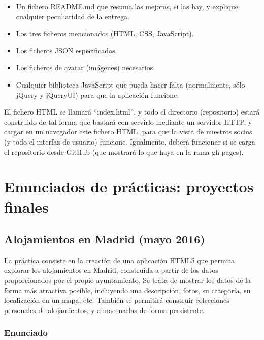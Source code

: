 \begin{itemize}
\item Un fichero README.md que resuma las mejoras, si las hay, y explique cualquier peculiaridad de la entrega.
\item Los tres ficheros mencionados (HTML, CSS, JavaScript).
\item Los ficheros JSON especificados.
\item Los ficheros de avatar (imágenes) necesarios.
\item Cualquier biblioteca JavaScript que pueda hacer falta (normalmente, sólo jQuery y jQueryUI) para que la aplicación funcione.
\end{itemize}

El fichero HTML se llamará ``index.html'', y todo el directorio (repositorio) estará construido de tal forma que bastará con servirlo mediante un servidor HTTP, y cargar en un navegador este fichero HTML, para que la vista de nuestros socios (y todo el interfaz de usuario) funcione. Igualmente, deberá funcionar si se carga el repositorio desde GitHub (que mostrará lo que haya en la rama gh-pages).


\chapter{Enunciados de prácticas: proyectos finales}

\section{Alojamientos en Madrid (mayo 2016)}

\label{sec:final-16-mayo}

La práctica consiste en la creación de una aplicación HTML5 que permita explorar los alojamientos en Madrid, construida a partir de los datos proporcionados por el propio ayuntamiento. Se trata de mostrar los datos de la forma más atractiva posible, incluyendo una descripción, fotos, su categoría, su localización en un mapa, etc. También se permitirá construir colecciones personales de alojamientos, y almacenarlas de forma persistente.

\subsection{Enunciado}

